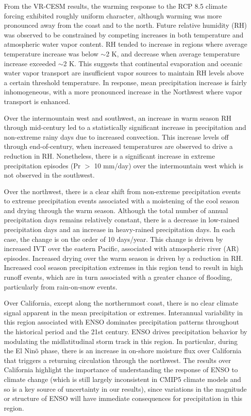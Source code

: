 \documentclass{ametsoc}
\begin{document}
From the VR-CESM results, the warming response to the RCP 8.5 climate forcing exhibited roughly uniform character, although warming was more pronounced away from the coast and to the north.  Future relative humidity (RH) was observed to be constrained by competing increases in both temperature and atmospheric water vapor content. RH tended to increase in regions where average temperature increase was below $\sim$2 K, and decrease when average temperature increase exceeded $\sim$2 K. This suggests that continental evaporation and oceanic water vapor transport are insufficient vapor sources to maintain RH levels above a certain threshold temperature.  In response, mean precipitation increase is fairly inhomogeneous, with a more pronounced increase in the Northwest where vapor transport is enhanced.

Over the intermountain west and southwest, an increase in warm season RH through mid-century led to a statistically significant increase in precipitation and non-extreme rainy days due to increased convection. This increase levels off through end-of-century, when increased temperatures are observed to drive a reduction in RH.  Nonetheless, there is a significant increase in extreme precipitation episodes (Pr $>$ 10 mm/day) over the intermountain west which is not observed in the southwest.

Over the northwest, there is a clear shift from non-extreme precipitation events to extreme precipitation events associated with a moistening of the cool season and drying through the warm season.  Although the total number of annual precipitation days remains relatively constant, there is a decrease in low-rained precipitation days and an increase in heavy-rained precipitation days.  In each case, the change is on the order of 10 days/year.  This change is driven by increased IVT over the eastern Pacific, associated with atmospheric river (AR) episodes. Increased drying over the warm season is driven by a reduction in RH.  Increased cool season precipitation extremes in this region tend to result in high runoff events, which are in turn associated with a greater chance of flooding, particularly from rain-on-snow events.

Over California, except along the northernmost coast, there is no clear climate signal apparent in the mean precipitation or extremes. Interannual variability in this region associated with ENSO dominates precipitation patterns throughout the historical period and the 21st century. ENSO drives precipitation behavior by modulating the midlatitudinal storm track in this region.  In particular, during the El Nin\~o phase, there is an increase in on-shore moisture flux over California that triggers a returning circulation through the northwest.  The results over California highlight the importance of understanding the response of ENSO to climate change (which is still largely inconsistent in CMIP5 climate models and so is a key source of uncertainty in our results), since variations in the magnitude or structure of ENSO will have immediate consequences for precipitation in this region.
\end{document}
